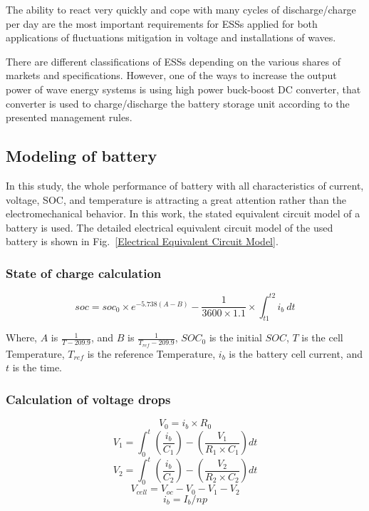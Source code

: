 \documentclass[conference]{IEEEtran}
\begin{document}
The ability to react very quickly and cope with many cycles of discharge/charge per day are the most important requirements for ESSs applied for both applications of fluctuations mitigation in voltage and installations of waves.


There are different classifications of ESSs depending on the various shares of markets and specifications. However, one of the ways to increase the output power of wave energy systems is using high power buck-boost DC converter, that converter is used to charge/discharge the battery storage unit according to the presented management rules.
%
\subsection{Modeling of battery}
In this study, the whole performance of battery with all characteristics of current, voltage, SOC, and temperature is attracting a great attention rather than the electromechanical behavior.  In this work, the stated equivalent circuit model of a battery is used. The detailed electrical equivalent circuit model of the used battery is shown in Fig.~\ref{Electrical Equivalent Circuit Model}.
\subsubsection{State of charge calculation}
\begin{equation}
	soc=soc_0 \times e^{-5.738(A-B)}-\frac{1}{3600\times1.1}\times \int_{t1}^{t2}{i_b\ dt}\label{Soc}
\end{equation}

Where, $A$ is $\frac{1}{T-209.9}$, and $B$ is $\frac{1}{T_{ref}-209.9}$, $SOC_0$ is the initial $SOC$, $T$ is the cell Temperature, $T_{ref}$ is the reference Temperature, $i_{b}$ is the battery cell current, and $t$ is the time.
\subsubsection{Calculation of voltage drops}
\begin{equation}
	V_0 = i_b \times R_0\label{vo}
\end{equation}
\begin{equation}
	V_1=\int_{0}^{t}{\left(\frac{i_b}{C_1}\right)-\left(\frac{V_1}{R_1\times C_{1}}\right) dt} \label{v1}
\end{equation}
\begin{equation}
	V_2=\int_{0}^{t}{\left(\frac{i_b}{C_2}\right)-\left(\frac{V_2}{R_2\times C_{2}}\right) dt} \label{v2}
\end{equation}
\begin{equation}
	V_{cell}= V_{oc}-V_0-V_1-V_2\label{vcell}
\end{equation}
\begin{equation}
	i_b = I_b/np\label{ib}
\end{equation}
\end{document}

